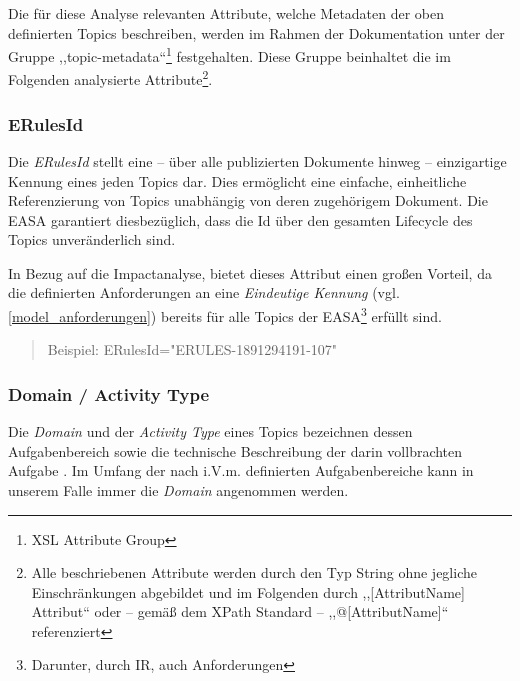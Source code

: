     Die für diese Analyse relevanten Attribute, welche Metadaten der oben definierten Topics beschreiben, werden im Rahmen der Dokumentation unter der Gruppe ,,\textsf{topic-metadata}``\footnote{\ac{XSL} Attribute Group} festgehalten.
    Diese Gruppe beinhaltet die im Folgenden analysierte Attribute\footnote{Alle beschriebenen Attribute werden durch den Typ String ohne jegliche Einschränkungen abgebildet und im Folgenden durch ,,[AttributName] Attribut`` oder -- gemäß dem XPath Standard -- ,,@[AttributName]`` referenziert}. \cite[9]{easa_xml_schema}

\subsubsection{ERulesId}

    Die \textit{ERulesId} stellt eine -- über alle publizierten Dokumente hinweg -- einzigartige Kennung eines jeden Topics dar.
    Dies ermöglicht eine einfache, einheitliche Referenzierung von Topics unabhängig von deren zugehörigem Dokument.
    Die \ac{EASA} garantiert diesbezüglich, dass die Id über den gesamten Lifecycle des Topics unveränderlich sind. \cite[17]{easa_xml_doc}
    
    In Bezug auf die Impactanalyse, bietet dieses Attribut einen großen Vorteil, da die definierten Anforderungen an eine \textit{Eindeutige Kennung} (vgl. \ref{model_anforderungen}) bereits für alle Topics der \ac{EASA}\footnote{Darunter, durch \ac{IR}, auch \atmans Anforderungen} erfüllt sind.
    \begin{quote}
    Beispiel:
    \textsf{ERulesId="{}ERULES-1891294191-107"}
    \end{quote}

    
\subsubsection{Domain / Activity Type}

    Die \textit{Domain} und der \textit{Activity Type} eines Topics bezeichnen dessen Aufgabenbereich sowie die technische Beschreibung der darin vollbrachten Aufgabe \cite[S. 18]{easa_xml_doc}.
    Im Umfang der nach  i.V.m.  definierten Aufgabenbereiche kann in unserem Falle immer die \textit{Domain} \atmans angenommen werden.
    
